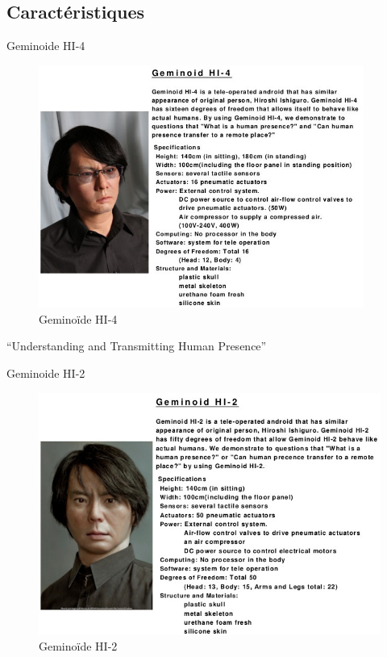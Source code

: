 \documentclass{beamer}
\begin{document}
\subsection{Caractéristiques}
\begin{frame}{Geminoide HI-4}
  \begin{figure}
    \centering
    \includegraphics[width=0.95\textwidth]{data/geminoid-HI4}
    \caption{Geminoïde HI-4}
  \end{figure}
  ``Understanding and Transmitting Human Presence''\\
\end{frame}

\begin{frame}{Geminoide HI-2}
  \begin{figure}
    \centering
    \includegraphics[width=\textwidth]{data/geminoid-HI2}
    \caption{Geminoïde HI-2}
  \end{figure}
\end{frame}
\end{document}
